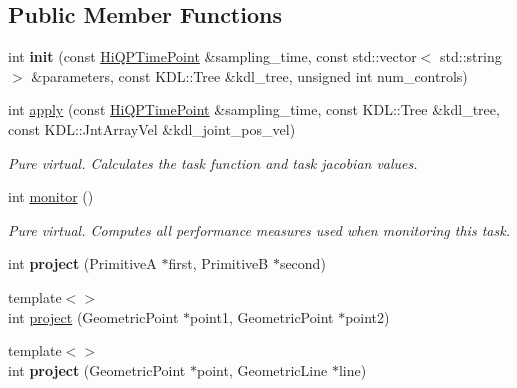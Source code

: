 \subsection*{Public Member Functions}
\begin{DoxyCompactItemize}
\item 
\hypertarget{classhiqp_1_1tasks_1_1TaskGeometricProjection_ad7be5c046999f3594a986df1a67211ea}{int {\bfseries init} (const \hyperlink{classhiqp_1_1HiQPTimePoint}{Hi\-Q\-P\-Time\-Point} \&sampling\-\_\-time, const std\-::vector$<$ std\-::string $>$ \&parameters, const K\-D\-L\-::\-Tree \&kdl\-\_\-tree, unsigned int num\-\_\-controls)}\label{classhiqp_1_1tasks_1_1TaskGeometricProjection_ad7be5c046999f3594a986df1a67211ea}

\item 
int \hyperlink{classhiqp_1_1tasks_1_1TaskGeometricProjection_a80d6bb74fb3faae77a6ef3e141846761}{apply} (const \hyperlink{classhiqp_1_1HiQPTimePoint}{Hi\-Q\-P\-Time\-Point} \&sampling\-\_\-time, const K\-D\-L\-::\-Tree \&kdl\-\_\-tree, const K\-D\-L\-::\-Jnt\-Array\-Vel \&kdl\-\_\-joint\-\_\-pos\-\_\-vel)
\begin{DoxyCompactList}\small\item\em {\itshape Pure virtual}. Calculates the task function and task jacobian values. \end{DoxyCompactList}\item 
int \hyperlink{classhiqp_1_1tasks_1_1TaskGeometricProjection_a58d7416dfaa2ff0241065be68282848c}{monitor} ()
\begin{DoxyCompactList}\small\item\em {\itshape Pure virtual}. Computes all performance measures used when monitoring this task. \end{DoxyCompactList}\item 
\hypertarget{classhiqp_1_1tasks_1_1TaskGeometricProjection_a2ea2fb575435f71a21e3f04fe3fc6f83}{int {\bfseries project} (Primitive\-A $\ast$first, Primitive\-B $\ast$second)}\label{classhiqp_1_1tasks_1_1TaskGeometricProjection_a2ea2fb575435f71a21e3f04fe3fc6f83}

\item 
{\footnotesize template$<$$>$ }\\int \hyperlink{classhiqp_1_1tasks_1_1TaskGeometricProjection_a37272247434d8b14c819649f25234cc6}{project} (Geometric\-Point $\ast$point1, Geometric\-Point $\ast$point2)
\item 
\hypertarget{classhiqp_1_1tasks_1_1TaskGeometricProjection_ad292a6cae9f94804290cf21479aac21a}{{\footnotesize template$<$$>$ }\\int {\bfseries project} (Geometric\-Point $\ast$point, Geometric\-Line $\ast$line)}\label{classhiqp_1_1tasks_1_1TaskGeometricProjection_ad292a6cae9f94804290cf21479aac21a}


\end{DoxyCompactItemize}
